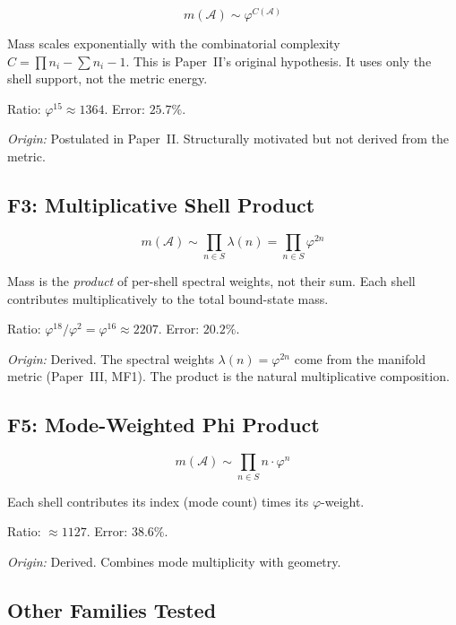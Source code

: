 \documentclass[12pt]{article}
\newcommand{\Acal}{\mathcal{A}}
\newcommand{\phig}{\varphi}
\begin{document}
\begin{equation}
    m(\Acal) \sim \phig^{C(\Acal)}
\end{equation}

Mass scales exponentially with the combinatorial complexity $C = \prod n_i - \sum n_i - 1$. This is Paper~II's original hypothesis. It uses only the shell support, not the metric energy.

Ratio: $\phig^{15} \approx 1364$. Error: $25.7\%$.

\textit{Origin:} Postulated in Paper~II. Structurally motivated but not derived from the metric.

\subsection{F3: Multiplicative Shell Product}

\begin{equation}\label{eq:F3}
    m(\Acal) \sim \prod_{n \in S} \lambda(n) = \prod_{n \in S} \phig^{2n}
\end{equation}

Mass is the \textit{product} of per-shell spectral weights, not their sum. Each shell contributes multiplicatively to the total bound-state mass.

Ratio: $\phig^{18}/\phig^2 = \phig^{16} \approx 2207$. Error: $20.2\%$.

\textit{Origin:} Derived. The spectral weights $\lambda(n) = \phig^{2n}$ come from the manifold metric (Paper~III, MF1). The product is the natural multiplicative composition.

\subsection{F5: Mode-Weighted Phi Product}

\begin{equation}
    m(\Acal) \sim \prod_{n \in S} n \cdot \phig^n
\end{equation}

Each shell contributes its index (mode count) times its $\phig$-weight.

Ratio: $\approx 1127$. Error: $38.6\%$.

\textit{Origin:} Derived. Combines mode multiplicity with geometry.

\subsection{Other Families Tested}
\end{document}
